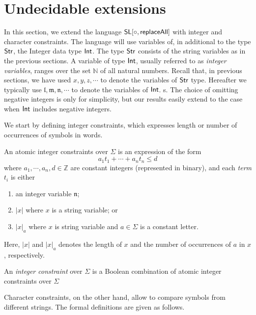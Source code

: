 
\section{Undecidable extensions}

In this section, we extend the language $\mathsf{SL}[\circ,\mathsf{replaceAll}]$ with integer and character constraints. The language will use variables of, in additional to the type ${\sf Str}$, the Integer data type ${\sf Int}$. The type ${\sf Str}$ consists of the string variables as in the previous sections. A variable of type ${\sf Int}$, usually referred to as \emph{integer variables}, ranges over the set $\mathbb{N}$ of all natural numbers. Recall that, in previous sections, we have used $x, y, z, \cdots$ to denote the variables of ${\sf Str}$ type.  Hereafter we typically use $\mathfrak{l}, \mathfrak{m}, \mathfrak{n}, \cdots$ to denote the variables of ${\sf Int}$. s. The
choice of omitting negative integers is only for simplicity, but our
results easily extend to the case when ${\sf Int}$ includes negative integers.

We start by defining integer constraints, which expresses length or number of occurrences of symbols in words. 


\begin{definition} An atomic integer constraints over $\Sigma$ is an expression of the form
	\[a_1t_1+\cdots+a_nt_n\leq d\]
where $a_1, \cdots, a_n,d\in \mathbb{Z}$ are constant integers (represented in binary), and each \emph{term} $t_i$ is either 
	\begin{enumerate}
		\item an integer variable $\mathfrak{n}$;
		\item $|x|$ where $x$ is a  string variable; or 
		\item $|x|_a$ where $x$ is string variable and $a\in \Sigma$ is a constant letter.
	\end{enumerate}
Here, $|x|$ and $|x|_a$ denotes the length of $x$ and the number of occurrences of $a$ in $x$, respectively. 

An \emph{integer constraint} over $\Sigma$ is a Boolean combination of atomic integer constraints over $\Sigma$
\end{definition}

Character constraints, on the other hand, allow to compare symbols from different strings. The formal definitions are given as follows. 

